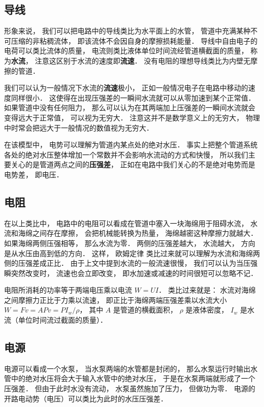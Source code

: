 
\begin{issues}
\issueDraft
\end{issues}

\subsection{导线}
形象来说， 我们可以把电路中的导线类比为水平面上的水管， 管道中充满某种不可压缩的非粘稠流体， 即该流体不会因自身的摩擦损耗能量． 导线中自由电子的电荷可以类比流体的质量， 电流则类比液体单位时间流经管道横截面的质量， 称为\textbf{水流}， 注意这区别于水流的速度即\textbf{流速}． 没有电阻的理想导线类比为内壁无摩擦的管道．

我们可以认为一般情况下水流的\textbf{流速}极小， 正如一般情况电子在电路中移动的速度同样很小． 这使得在出现压强差的一瞬间水流就可以从零加速到某个正常值． 如果管道中没有任何阻力， 那么可以认为在其两端加上压强差的一瞬间水流就会变得远大于正常值， 可以视为无穷大． 注意这并不是数学意义上的无穷大， 物理中时常会把远大于一般情况的数值视为无穷大．

在该模型中， 电势可以理解为管道内某点处的绝对水压． 事实上把整个管道系统各处的绝对水压整体增加一个常数并不会影响水流动的方式和快慢， 所以我们主要关心的是管道两点之间的\textbf{压强差}， 正如在电路中我们关心的不是绝对电势而是电势差， 即电压．

\subsection{电阻}
在以上类比中， 电路中的电阻可以看成在管道中塞入一块海绵用于阻碍水流， 水流和海绵之间存在摩擦， 会把机械能转换为热量， 海绵越密这种摩擦力就越大． 如果海绵两侧压强相等， 那么水流为零． 两侧的压强差越大， 水流越大， 方向是从水压由高到低的方向． 这样， 欧姆定律 类比过来就可以理解为水流和海绵两侧的压强差成正比． 由于上文中提到水流的一般流速很慢， 我们可以认为当压强瞬突然改变时， 流速也会立即改变， 即水加速或减速的时间很短可以忽略不记．

电阻所消耗的功率等于两端电压乘以电流 $W = UI$． 类比过来就是： 水流对海绵之间摩擦力正比于力乘以流速， 即正比于海绵两端压强差乘以水流大小 $W = F v = APv = PI_w/\rho$， 其中 $A$ 是管道的横截面积， $\rho$ 是液体密度， $I_w$ 是水流（单位时间流过截面的质量）．

\subsection{电源}
电源可以看成一个水泵， 当水泵两端的水管都是封闭的， 那么水泵运行时输出水管中的绝对水压将会大于输入水管中的绝对水压， 于是在水泵两端就形成了一个压强差． 但由于此时水没有流动， 水泵虽然施加了压力， 但做功为零． 电源的开路电动势（电压）可以类比为此时的水压压强差．

